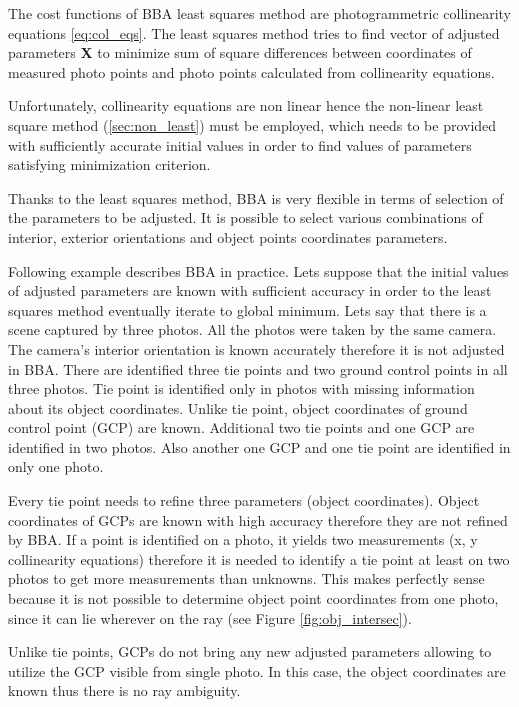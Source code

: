 \documentclass[a4paper,12pt]{article}
\newcommand{\evect}[1]{%
{\bf #1}%
}
\begin{document}
The cost functions of BBA least squares method are photogrammetric collinearity equations \eqref{eq:col_eqs}.
The least squares method tries to find vector of adjusted parameters \evect{X} to minimize
sum  of square differences between coordinates of measured photo points and photo points calculated 
from collinearity equations.

Unfortunately, collinearity equations are non linear hence the non-linear least square method (\ref{sec:non_least}) must be employed, which 
needs to be provided  with sufficiently accurate initial values in order to find values of parameters satisfying minimization criterion.

Thanks to the least squares method, BBA is very flexible in terms of selection of the parameters to be adjusted. 
It is possible to select various combinations of interior, exterior orientations and object points coordinates parameters. 

Following example describes BBA in practice.
Lets suppose that the initial values of adjusted parameters are known with sufficient accuracy in order to the least squares
method eventually iterate to global minimum.
Lets say that there is a scene captured by three photos.
All the photos were taken by the same camera.
The camera's interior orientation is known accurately therefore it is not adjusted in BBA.
There are identified three tie points and two ground control points in all three photos.
Tie point is identified only in photos with missing information about its object coordinates.  
Unlike tie point, object coordinates of ground control point (GCP) are known.
Additional two tie points and one GCP are identified in two photos.
Also another one GCP and one tie point are identified 
in only one photo. 


Every tie point needs to refine three parameters (object coordinates). 
Object coordinates of GCPs are known with high accuracy therefore they are not refined by BBA. 
If a point is identified on a photo, it yields two measurements (x, y collinearity equations) 
therefore it is needed to identify a tie point at least on two photos to get more measurements 
than unknowns. This makes perfectly sense because it is not possible to determine object point coordinates from one photo,
since it can lie wherever on the ray (see Figure \ref{fig:obj_intersec}).

Unlike tie points, GCPs do not bring any new adjusted parameters 
allowing to utilize the GCP visible from single photo. In this case, the object coordinates 
are known thus there is no ray ambiguity. 
\end{document}
